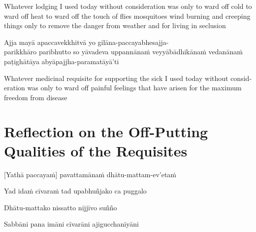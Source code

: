 \begin{english}
  Whatever lodging I used today without consideration was only to ward off
  cold to ward off heat to ward off the touch of flies mosquitoes wind
  burning and creeping things only to remove the danger from weather and for
  living in seclusion
\end{english}

Ajja mayā apaccavekkhitvā yo gilāna-paccayabhesajja-\\ parikkhāro paribhutto so
yāvadeva uppannānaṁ veyyābādhikānaṁ vedanānaṁ paṭighātāya
abyāpajjha-paramatāyā'ti

\begin{english}
  Whatever medicinal requisite for supporting the sick I used today without
  consideration was only to ward off painful feelings that have arisen for the
  maximum freedom from disease\\
\end{english}

\section[Reflection on the Off-Putting Qualities]{Reflection on the Off-Putting Qualities of the Requisites}



\begin{leader}
\end{leader}


[Yathā paccayaṁ] pavattamānaṁ dhātu-mattam-ev'etaṁ


Yad idaṁ cīvaraṁ tad upabhuñjako ca puggalo


Dhātu-mattako nissatto nijjīvo suñño


Sabbāni pana imāni cīvarāni ajigucchanīyāni


